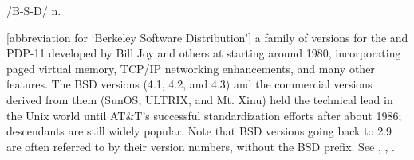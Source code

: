  /B-S-D/ n.

[abbreviation for `Berkeley Software Distribution'] a family of 
versions for the  and PDP-11 developed by Bill Joy and others
at  starting around 1980, incorporating paged virtual
memory, TCP/IP networking enhancements, and many other features. The BSD
versions (4.1, 4.2, and 4.3) and the commercial versions derived from them
(SunOS, ULTRIX, and Mt. Xinu) held the technical lead in the Unix world until
AT\&T's successful standardization efforts after about 1986; descendants are
still widely popular. Note that BSD versions going back to 2.9 are often
referred to by their version numbers, without the BSD prefix. See
, , .

